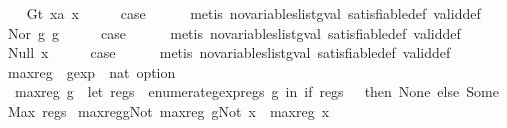 \begin{isabellebody}
\isamarkupfalse%
\isanewline
\ \ \isamarkupfalse%
\ {\isacharparenleft}Gt\ x{}a\ x{}{\isacharparenright}\isanewline
\ \ \isamarkupfalse%
\ \isamarkupfalse%
\ {\isacharquery}case\isanewline
\ \ \ \ \isamarkupfalse%
\ {\isacharparenleft}metis\ no{\isacharunderscore}variables{\isacharunderscore}list{\isacharunderscore}gval\ satisfiable{\isacharunderscore}def\ valid{\isacharunderscore}def{\isacharparenright}\isanewline
{}\isamarkupfalse%
\isanewline
\ \ \isamarkupfalse%
\ {\isacharparenleft}Nor\ g{}\ g{}{\isacharparenright}\isanewline
\ \ \isamarkupfalse%
\ \isamarkupfalse%
\ {\isacharquery}case\isanewline
\ \ \ \ \isamarkupfalse%
\ {\isacharparenleft}metis\ no{\isacharunderscore}variables{\isacharunderscore}list{\isacharunderscore}gval\ satisfiable{\isacharunderscore}def\ valid{\isacharunderscore}def{\isacharparenright}\isanewline
{}\isamarkupfalse%
\isanewline
\ \ \isamarkupfalse%
\ {\isacharparenleft}Null\ x{\isacharparenright}\isanewline
\ \ \isamarkupfalse%
\ \isamarkupfalse%
\ {\isacharquery}case\isanewline
\ \ \ \ \isamarkupfalse%
\ {\isacharparenleft}metis\ no{\isacharunderscore}variables{\isacharunderscore}list{\isacharunderscore}gval\ satisfiable{\isacharunderscore}def\ valid{\isacharunderscore}def{\isacharparenright}\isanewline
{}\isamarkupfalse%
%
\endisatagproof
{\isafoldproof}%
%
\isadelimproof
\isanewline
%
\endisadelimproof
\isanewline
{}\isamarkupfalse%
\ max{\isacharunderscore}reg\ {\isacharcolon}{\isacharcolon}\ {\isachardoublequoteopen}gexp\ {\isasymRightarrow}\ nat\ option{\isachardoublequoteclose}\ \isanewline
\ \ {\isachardoublequoteopen}max{\isacharunderscore}reg\ g\ {\isacharequal}\ {\isacharparenleft}let\ regs\ {\isacharequal}\ {\isacharparenleft}enumerate{\isacharunderscore}gexp{\isacharunderscore}regs\ g{\isacharparenright}\ in\ if\ regs\ {\isacharequal}\ {\isacharbraceleft}{\isacharbraceright}\ then\ None\ else\ Some\ {\isacharparenleft}Max\ regs{\isacharparenright}{\isacharparenright}{\isachardoublequoteclose}\isanewline
\isanewline
{}\isamarkupfalse%
\ max{\isacharunderscore}reg{\isacharunderscore}gNot{\isacharcolon}\ {\isachardoublequoteopen}max{\isacharunderscore}reg\ {\isacharparenleft}gNot\ x{\isacharparenright}\ {\isacharequal}\ max{\isacharunderscore}reg\ x{\isachardoublequoteclose}\isanewline

\end{isabellebody}

